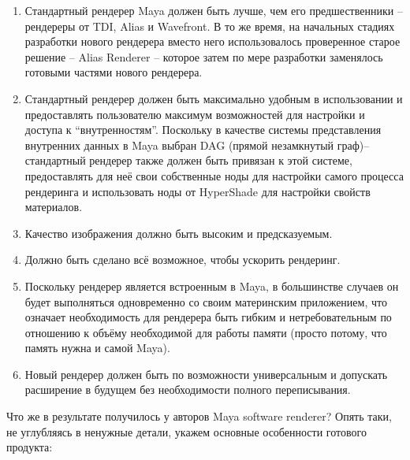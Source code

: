 \begin{enumerate}
\item Стандартный рендерер Maya должен быть лучше, чем его предшественники – рендереры от TDI, Alias и Wavefront. В то же время, на начальных стадиях разработки нового
рендерера вместо него использовалось проверенное старое решение – Alias Renderer – которое затем по мере разработки заменялось готовыми частями нового рендерера.

\item Стандартный рендерер должен быть максимально удобным в использовании и предоставлять пользователю максимум возможностей для настройки и доступа к
“внутренностям”. Поскольку в качестве системы представления внутренних данных в Maya выбран DAG (прямой незамкнутый граф)– стандартный рендерер также должен быть
привязан к этой системе, предоставлять для неё свои собственные ноды для настройки самого процесса рендеринга и использовать ноды от HyperShade для настройки свойств
материалов.

\item Качество изображения должно быть высоким и предсказуемым.

\item Должно быть сделано всё возможное, чтобы ускорить рендеринг.

\item Поскольку рендерер является встроенным в Maya, в большинстве случаев он будет выполняться одновременно со своим материнским приложением, что означает
необходимость для рендерера быть гибким и нетребовательным по отношению к объёму необходимой для работы памяти (просто потому, что память нужна и самой Maya).

\item Новый рендерер должен быть по возможности универсальным и допускать расширение в будущем без необходимости полного переписывания.
 
\end{enumerate}


Что же в результате получилось у авторов Maya software renderer? Опять
   таки, не углубляясь в ненужные детали, укажем основные особенности
   готового продукта:


